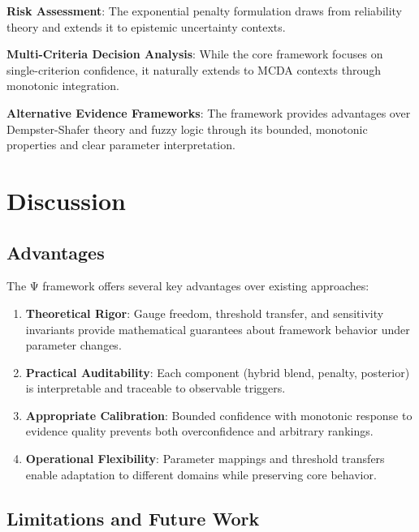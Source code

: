 \documentclass[12pt,a4paper]{article}
\begin{document}
\textbf{Risk Assessment}: The exponential penalty formulation draws from reliability theory \citep{Cox1972, BarlowProschan1981} and extends it to epistemic uncertainty contexts.

\textbf{Multi-Criteria Decision Analysis}: While the core framework focuses on single-criterion confidence, it naturally extends to MCDA contexts \citep{KeeneyRaiffa1993, Saaty1980} through monotonic integration.

\textbf{Alternative Evidence Frameworks}: The framework provides advantages over Dempster-Shafer theory \citep{Shafer1976} and fuzzy logic \citep{Zadeh1965} through its bounded, monotonic properties and clear parameter interpretation.

\section{Discussion}

\subsection{Advantages}

The Ψ framework offers several key advantages over existing approaches:

\begin{enumerate}
\item \textbf{Theoretical Rigor}: Gauge freedom, threshold transfer, and sensitivity invariants provide mathematical guarantees about framework behavior under parameter changes.

\item \textbf{Practical Auditability}: Each component (hybrid blend, penalty, posterior) is interpretable and traceable to observable triggers.

\item \textbf{Appropriate Calibration}: Bounded confidence with monotonic response to evidence quality prevents both overconfidence and arbitrary rankings.

\item \textbf{Operational Flexibility}: Parameter mappings and threshold transfers enable adaptation to different domains while preserving core behavior.
\end{enumerate}

\subsection{Limitations and Future Work}
\end{document}
